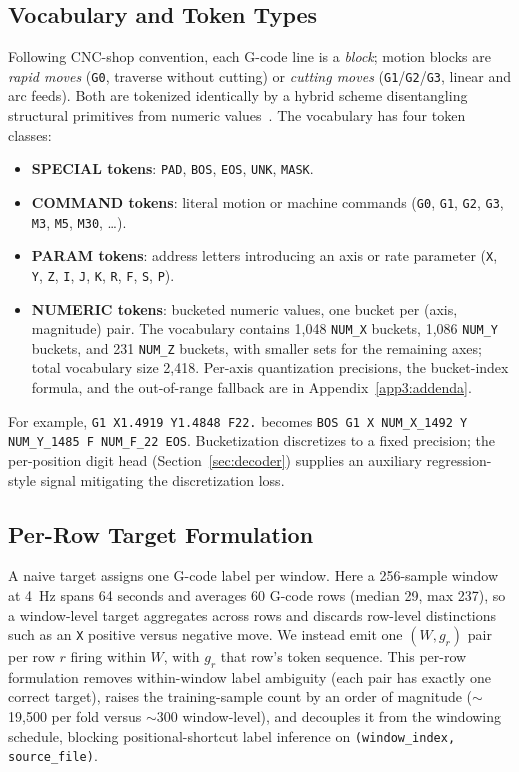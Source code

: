 \documentclass[sensors,article,submit,moreauthors,pdftex]{Definitions/mdpi}
\begin{document}
\subsection{Vocabulary and Token Types}
\label{sec:problem-vocab}

Following CNC-shop convention, each G-code line is a \emph{block}; motion blocks are \emph{rapid moves} (\texttt{G0}, traverse without cutting) or \emph{cutting moves} (\texttt{G1}/\texttt{G2}/\texttt{G3}, linear and arc feeds). Both are tokenized identically by a hybrid scheme disentangling structural primitives from numeric values~\cite{grammar_paper,gcode_foundational}. The vocabulary has four token classes:
\begin{itemize}
\item \textbf{SPECIAL tokens}: \texttt{PAD}, \texttt{BOS}, \texttt{EOS}, \texttt{UNK}, \texttt{MASK}.
\item \textbf{COMMAND tokens}: literal motion or machine commands (\texttt{G0}, \texttt{G1}, \texttt{G2}, \texttt{G3}, \texttt{M3}, \texttt{M5}, \texttt{M30}, \ldots).
\item \textbf{PARAM tokens}: address letters introducing an axis or rate parameter (\texttt{X}, \texttt{Y}, \texttt{Z}, \texttt{I}, \texttt{J}, \texttt{K}, \texttt{R}, \texttt{F}, \texttt{S}, \texttt{P}).
\item \textbf{NUMERIC tokens}: bucketed numeric values, one bucket per (axis, magnitude) pair. The vocabulary contains 1{,}048 \texttt{NUM\_X} buckets, 1{,}086 \texttt{NUM\_Y} buckets, and 231 \texttt{NUM\_Z} buckets, with smaller sets for the remaining axes; total vocabulary size 2{,}418. Per-axis quantization precisions, the bucket-index formula, and the out-of-range fallback are in Appendix~\ref{app3:addenda}.
\end{itemize}

For example, \texttt{G1 X1.4919 Y1.4848 F22.} becomes \texttt{BOS G1 X NUM\_X\_1492 Y NUM\_Y\_1485 F NUM\_F\_22 EOS}. Bucketization discretizes to a fixed precision; the per-position digit head (Section~\ref{sec:decoder}) supplies an auxiliary regression-style signal mitigating the discretization loss.

\subsection{Per-Row Target Formulation}
\label{sec:per-row}

A naive target assigns one G-code label per window. Here a 256-sample window at 4~Hz spans 64 seconds and averages 60 G-code rows (median 29, max 237), so a window-level target aggregates across rows and discards row-level distinctions such as an \texttt{X} positive versus negative move. We instead emit one $(W, g_r)$ pair per row $r$ firing within $W$, with $g_r$ that row's token sequence. This per-row formulation removes within-window label ambiguity (each pair has exactly one correct target), raises the training-sample count by an order of magnitude ($\sim$19{,}500 per fold versus $\sim$300 window-level), and decouples it from the windowing schedule, blocking positional-shortcut label inference on \texttt{(window\_index, source\_file)}.
\end{document}
